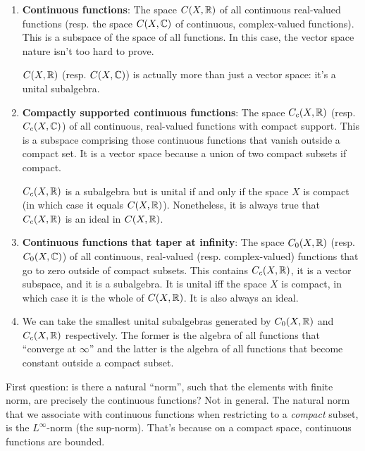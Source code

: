 \documentclass[a4paper]{amsart}
\begin{document}
\begin{enumerate}

\item {\bf Continuous functions}: The space $C(X,\mathbb{R})$ of all continuous
  real-valued functions (resp. the space $C(X,\mathbb{C})$ of continuous,
  complex-valued functions). This is a subspace of the space of all
  functions. In this case, the vector space nature isn't too hard to
  prove.

  $C(X,\mathbb{R})$ (resp. $C(X,\mathbb{C})$) is actually more than just a vector
  space: it's a unital subalgebra.

\item {\bf Compactly supported continuous functions}: The space
  $C_c(X,\mathbb{R})$ (resp. $C_c(X,\mathbb{C})$) of all continuous, real-valued
  functions with compact support. This is a subspace comprising
  those continuous functions that vanish outside a compact set. It
  is a vector space because a union of two compact subsets if
  compact.
  
  $C_c(X,\mathbb{R})$ is a subalgebra but is unital if and only if the space
  $X$ is compact (in which case it equals $C(X,\mathbb{R})$). Nonetheless, it
  is always true that $C_c(X,\mathbb{R})$ is an ideal in $C(X,\mathbb{R})$.
  
\item {\bf Continuous functions that taper at infinity}: The space
  $C_0(X,\mathbb{R})$ (resp. $C_0(X,\mathbb{C})$) of all continuous, real-valued
  (resp. complex-valued) functions that go to zero outside of compact
  subsets. This contains $C_c(X,\mathbb{R})$, it is a vector subspace, and it
  is a subalgebra. It is unital iff the space $X$ is compact, in which
  case it is the whole of $C(X,\mathbb{R})$. It is also always an ideal.

\item We can take the smallest unital subalgebras generated by
  $C_0(X,\mathbb{R})$ and $C_c(X,\mathbb{R})$ respectively. The former is the algebra
  of all functions that ``converge at $\infty$'' and the latter is the
  algebra of all functions that become constant outside a compact subset.

\end{enumerate}

First question: is there a natural ``norm'', such that the elements
with finite norm, are precisely the continuous functions? Not in
general. The natural norm that we associate with continuous functions
when restricting to a {\em compact} subset, is the $L^\infty$-norm
(the sup-norm). That's because on a compact space, continuous
functions are bounded.
\end{document}
